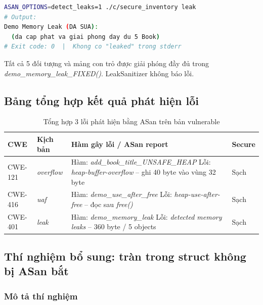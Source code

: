\begin{lstlisting}[language=bash, caption={Bản secure -- leak clean}]
ASAN_OPTIONS=detect_leaks=1 ./c/secure_inventory leak
# Output:
Demo Memory Leak (DA SUA):
  (da cap phat va giai phong day du 5 Book)
# Exit code: 0  |  Khong co "leaked" trong stderr
\end{lstlisting}

Tất cả 5 đối tượng và mảng con trỏ được giải phóng đầy đủ trong
\textit{demo\_memory\_leak\_FIXED()}. LeakSanitizer không báo lỗi.

\subsection{Bảng tổng hợp kết quả phát hiện lỗi}

\begin{table}[H]
\centering
\small
\begin{tabularx}{\textwidth}{|p{1.5cm}|p{1.8cm}|X|p{1.3cm}|}
\hline
\textbf{CWE} & \textbf{Kịch bản} & \textbf{Hàm gây lỗi / ASan report} & \textbf{Secure} \\ \hline
CWE-121 & \textit{overflow} &
  Hàm: \textit{add\_book\_title\_UNSAFE\_HEAP} \newline
  Lỗi: \textit{heap-buffer-overflow} -- ghi 40 byte vào vùng 32 byte & Sạch \\ \hline
CWE-416 & \textit{uaf} &
  Hàm: \textit{demo\_use\_after\_free} \newline
  Lỗi: \textit{heap-use-after-free} -- đọc sau \textit{free()} & Sạch \\ \hline
CWE-401 & \textit{leak} &
  Hàm: \textit{demo\_memory\_leak} \newline
  Lỗi: \textit{detected memory leaks} -- 360 byte / 5 objects & Sạch \\ \hline
\end{tabularx}
\caption{Tổng hợp 3 lỗi phát hiện bằng ASan trên bản vulnerable}
\end{table}

\subsection{Thí nghiệm bổ sung: tràn trong struct không bị ASan bắt}

\subsubsection{Mô tả thí nghiệm}

